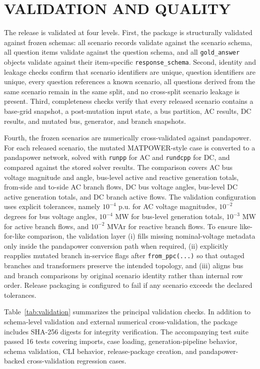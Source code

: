 \section*{VALIDATION AND QUALITY}

The release is validated at four levels. First, the package is structurally validated against frozen schemas: all \datasetscenarios{} scenario records validate against the scenario schema, all \datasetquestions{} question items validate against the question schema, and all \datasetquestions{} \texttt{gold\_answer} objects validate against their item-specific \texttt{response\_schema}. Second, identity and leakage checks confirm that scenario identifiers are unique, question identifiers are unique, every question references a known scenario, all questions derived from the same scenario remain in the same split, and no cross-split scenario leakage is present. Third, completeness checks verify that every released scenario contains a base-grid snapshot, a post-mutation input state, a bus partition, AC results, DC results, and mutated bus, generator, and branch snapshots.

Fourth, the frozen scenarios are numerically cross-validated against pandapower. For each released scenario, the mutated MATPOWER-style case is converted to a pandapower network, solved with \texttt{runpp} for AC and \texttt{rundcpp} for DC, and compared against the stored solver results. The comparison covers AC bus voltage magnitude and angle, bus-level active and reactive generation totals, from-side and to-side AC branch flows, DC bus voltage angles, bus-level DC active generation totals, and DC branch active flows. The validation configuration uses explicit tolerances, namely $10^{-4}$ p.u. for AC voltage magnitudes, $10^{-2}$ degrees for bus voltage angles, $10^{-4}$ MW for bus-level generation totals, $10^{-3}$ MW for active branch flows, and $10^{-2}$ MVAr for reactive branch flows. To ensure like-for-like comparison, the validation layer (i) fills missing nominal-voltage metadata only inside the pandapower conversion path when required, (ii) explicitly reapplies mutated branch in-service flags after \texttt{from\_ppc(...)} so that outaged branches and transformers preserve the intended topology, and (iii) aligns bus and branch comparisons by original scenario identity rather than internal row order. Release packaging is configured to fail if any scenario exceeds the declared tolerances.

Table~\ref{tab:validation} summarizes the principal validation checks. In addition to schema-level validation and external numerical cross-validation, the package includes SHA-256 digests for integrity verification. The accompanying test suite passed 16 tests covering imports, case loading, generation-pipeline behavior, schema validation, CLI behavior, release-package creation, and pandapower-backed cross-validation regression cases.

